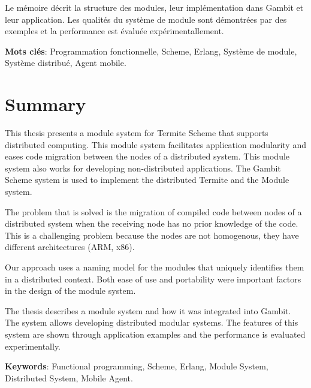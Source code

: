 \documentclass[12pt,maitrise]{dms}
\theoremstyle{definition}
\numberwithin{equation}{section}
\numberwithin{table}{chapter}
\numberwithin{figure}{chapter}
\begin{document}
Le mémoire décrit la structure des modules, leur implémentation dans Gambit et
leur application. Les qualités du système de module sont démontrées par des
exemples et la performance est évaluée expérimentallement.

\vspace*{1.5ex}
\noindent\textbf{Mots clés}: Programmation fonctionnelle,
Scheme, Erlang, Système de module, Système distribué, Agent mobile.


\anglais{}
\chapter*{Summary}

This thesis presents a module system for Termite Scheme that supports
distributed computing.  This module system facilitates application modularity
and eases code migration between the nodes of a distributed system. This module
system also works for developing non-distributed applications.  The Gambit Scheme
system is used to implement the distributed Termite and the Module system.

The problem that is solved is the migration of compiled code between nodes of a
distributed system when the receiving node has no prior knowledge of the code.
This is a challenging problem because the nodes are not homogenous, they have
different architectures (ARM, x86).

Our approach uses a naming model for the modules
that uniquely identifies them in a distributed
context. Both ease of use and portability were important factors
in the design of the module system.

The thesis describes a module system and how it was integrated into Gambit.
The system allows developing distributed modular systems.  The features of this
system are shown through application examples and the performance is evaluated
experimentally.


\vspace*{1.5ex}
\noindent\textbf{Keywords}: Functional programming, Scheme, Erlang,
Module System, Distributed System, Mobile Agent.

\end{document}

